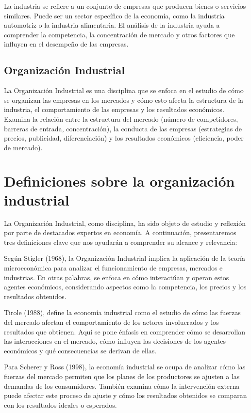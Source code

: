 \documentclass[
  doc,
  floatsintext,
  longtable,
  a4paper,
  nolmodern,
  notxfonts,
  notimes,
  colorlinks=true,linkcolor=blue,citecolor=blue,urlcolor=blue]{apa7}
\begin{document}
La industria se refiere a un conjunto de empresas que producen bienes o
servicios similares. Puede ser un sector específico de la economía, como
la industria automotriz o la industria alimentaria. El análisis de la
industria ayuda a comprender la competencia, la concentración de mercado
y otros factores que influyen en el desempeño de las empresas.

\subsection{Organización Industrial}\label{organizaciuxf3n-industrial}

La Organización Industrial es una disciplina que se enfoca en el estudio
de cómo se organizan las empresas en los mercados y cómo esto afecta la
estructura de la industria, el comportamiento de las empresas y los
resultados económicos. Examina la relación entre la estructura del
mercado (número de competidores, barreras de entrada, concentración), la
conducta de las empresas (estrategias de precios, publicidad,
diferenciación) y los resultados económicos (eficiencia, poder de
mercado).

\section{Definiciones sobre la organización
industrial}\label{definiciones-sobre-la-organizaciuxf3n-industrial}

La Organización Industrial, como disciplina, ha sido objeto de estudio y
reflexión por parte de destacados expertos en economía. A continuación,
presentaremos tres definiciones clave que nos ayudarán a comprender su
alcance y relevancia:

Según Stigler (1968), la Organización Industrial implica la aplicación
de la teoría microeconómica para analizar el funcionamiento de empresas,
mercados e industrias. En otras palabras, se enfoca en cómo interactúan
y operan estos agentes económicos, considerando aspectos como la
competencia, los precios y los resultados obtenidos.

Tirole (1988), define la economía industrial como el estudio de cómo las
fuerzas del mercado afectan el comportamiento de los actores
involucrados y los resultados que obtienen. Aquí se pone énfasis en
comprender cómo se desarrollan las interacciones en el mercado, cómo
influyen las decisiones de los agentes económicos y qué consecuencias se
derivan de ellas.

Para Scherer y Ross (1998), la economía industrial se ocupa de analizar
cómo las fuerzas del mercado permiten que los planes de los productores
se ajusten a las demandas de los consumidores. También examina cómo la
intervención externa puede afectar este proceso de ajuste y cómo los
resultados obtenidos se comparan con los resultados ideales o esperados.
\end{document}
